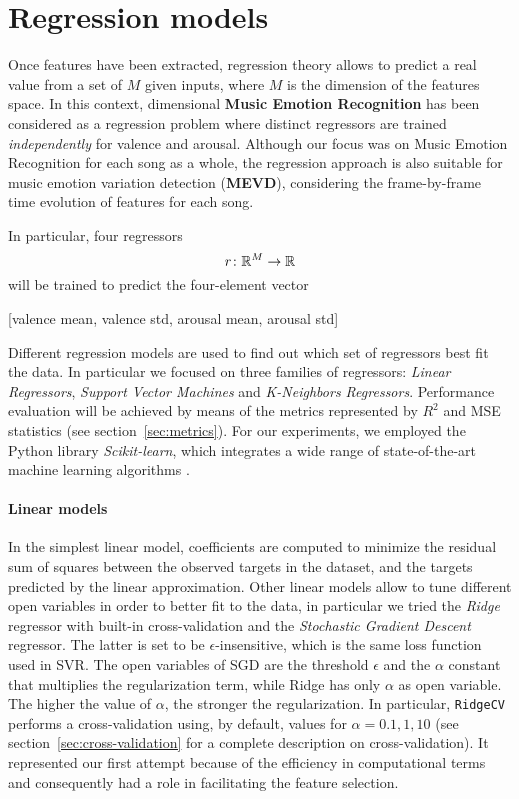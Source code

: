 \section{Regression models}\label{sec:regression}

Once features have been extracted, regression theory allows to predict a real value from a set of $M$ given inputs, where $M$ is the dimension of the features space.
In this context, dimensional \textbf{Music Emotion Recognition} has been considered as a regression problem where distinct regressors are trained \textit{independently} for valence and arousal.
Although our focus was on Music Emotion Recognition for each song as a whole, the regression approach is also suitable for music emotion variation detection (\textbf{MEVD}), considering the frame-by-frame time evolution of features for each song.

In particular, four regressors
\[
	r \colon \mathbb{R}^{M} \to \mathbb{R}
\]
will be trained to predict the four-element vector

\begin{center}
	[valence mean, valence std, arousal mean, arousal std]
\end{center}

Different regression models are used to find out which set of regressors best fit the data. In particular we focused on three families of regressors: \emph{Linear Regressors}, \emph{Support Vector Machines} and \emph{K-Neighbors Regressors}.
Performance evaluation will be achieved by means of the metrics represented by $R^2$ and MSE statistics (see section~\ref{sec:metrics}).
For our experiments, we employed the Python library \textit{Scikit-learn}, which integrates a wide range of state-of-the-art machine learning algorithms \cite{scikit-learn}.

\paragraph{Linear models}
In the simplest linear model, coefficients are computed to minimize the residual sum of squares between the observed targets in the dataset, and the targets predicted by the linear approximation.
Other linear models allow to tune different open variables in order to better fit to the data, in particular we tried the \emph{Ridge} regressor with built-in cross-validation and the \emph{Stochastic Gradient Descent} regressor.
The latter is set to be $\epsilon$-insensitive, which is the same loss function used in SVR.
The open variables of SGD are the threshold $\epsilon$ and the $\alpha$ constant that multiplies the regularization term, while Ridge has only $\alpha$ as open variable. The higher the value of $\alpha$, the stronger the regularization. In particular, \texttt{RidgeCV} performs a cross-validation using, by default, values for $\alpha = 0.1, 1, 10$ (see section~\ref{sec:cross-validation} for a complete description on cross-validation).
It represented our first attempt because of the efficiency in computational terms and consequently had a role in facilitating the feature selection.

